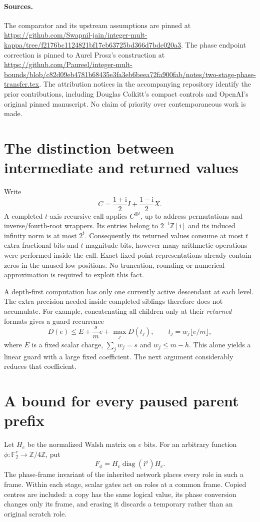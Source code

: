 \documentclass[11pt]{article}
\newcommand{\ii}{\mathrm i}
\newcommand{\Z}{\mathbb Z}
\begin{document}
\paragraph{Sources.}
The comparator and its upstream assumptions are pinned at
\url{https://github.com/Swapnil-jain/integer-mult-kappa/tree/f2176bc1124821bf17eb63725bd366d7bdc020a3}.
The phase endpoint correction is pinned to Aurel Prosz's construction at
\url{https://github.com/Paureel/integer-mult-bounds/blob/c82d09eb4781b68435e3fa3eb6beea72fa900fab/notes/two-stage-phase-transfer.tex}.
The attribution notices in the accompanying repository identify the prior
contributions, including Douglas Colkitt's compact controls and OpenAI's
original pinned manuscript. No claim of priority over contemporaneous work
is made.

\section{The distinction between intermediate and returned values}
Write
\[
 C=\frac{1+\ii}{2}I+\frac{1-\ii}{2}X.
\]
A completed $t$-axis recursive call applies $C^{\otimes t}$, up to address
permutations and inverse/fourth-root wrappers. Its entries belong to
$2^{-t}\Z[\ii]$ and its induced infinity norm is at most $2^t$.
Consequently its returned values consume at most $t$ extra fractional bits
and $t$ magnitude bits, however many arithmetic operations were performed
inside the call. Exact fixed-point representations already contain zeros in
the unused low positions. No truncation, rounding or numerical approximation
is required to exploit this fact.

A depth-first computation has only one currently active descendant at each
level. The extra precision needed inside completed siblings therefore does
not accumulate. For example, concatenating all children only at their
\emph{returned} formats gives a guard recurrence
\[
 D(e)\le E+\frac{s}{m}e+\max_j D(t_j),\qquad
 t_j=w_j\lfloor e/m\rfloor,
\]
where $E$ is a fixed scalar charge, $\sum_jw_j=s$ and
$w_j\le m-h$. This alone yields a linear guard with a large fixed
coefficient. The next argument considerably reduces that coefficient.

\section{A bound for every paused parent prefix}
Let $H_e$ be the normalized Walsh matrix on $e$ bits. For an arbitrary
function $\phi:\mathbb F_2^e\to\Z/4\Z$, put
\[
 F_\phi=H_e\operatorname{diag}(\ii^{\phi})H_e.
\]
The phase-frame invariant of the inherited network places every role in such
a frame. Within each stage, scalar gates act on roles at a common frame. Copied centres are
included: a copy has the same logical value, its phase conversion changes
only its frame, and erasing it discards a temporary rather than an original
scratch role.
\end{document}
